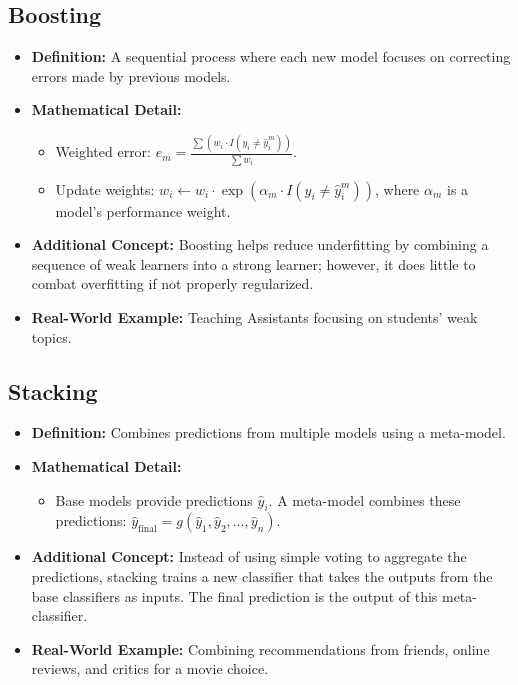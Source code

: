 \documentclass[10pt]{article}
\begin{document}
\subsection{Boosting}

\begin{itemize}
    \item \textbf{Definition:} A sequential process where each new model focuses on correcting errors made by previous models.
    \item \textbf{Mathematical Detail:}
    \begin{itemize}
        \item Weighted error: \(e_m = \frac{\sum (w_i \cdot I(y_i \neq \hat{y}_i^m))}{\sum w_i}\).
        \item Update weights: \(w_i \leftarrow w_i \cdot \exp(\alpha_m \cdot I(y_i \neq \hat{y}_i^m))\), where \(\alpha_m\) is a model's performance weight.
    \end{itemize}
    \item \textbf{Additional Concept:} Boosting helps reduce underfitting by combining a sequence of weak learners into a strong learner; however, it does little to combat overfitting if not properly regularized.
    \item \textbf{Real-World Example:} Teaching Assistants focusing on students' weak topics.
\end{itemize}

\subsection{Stacking}

\begin{itemize}
    \item \textbf{Definition:} Combines predictions from multiple models using a meta-model.
    \item \textbf{Mathematical Detail:}
    \begin{itemize}
        \item Base models provide predictions \(\hat{y}_i\). A meta-model combines these predictions: \(\hat{y}_{\text{final}} = g(\hat{y}_1, \hat{y}_2, \ldots, \hat{y}_n)\).
    \end{itemize}
    \item \textbf{Additional Concept:} Instead of using simple voting to aggregate the predictions, stacking trains a new classifier that takes the outputs from the base classifiers as inputs. The final prediction is the output of this meta-classifier.
    \item \textbf{Real-World Example:} Combining recommendations from friends, online reviews, and critics for a movie choice.
\end{itemize}
\end{document}

